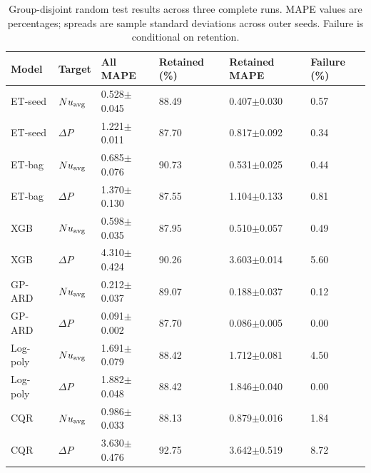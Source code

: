 \begin{table}[htbp]\centering\scriptsize\caption{Group-disjoint random test results across three complete runs. MAPE values are percentages; spreads are sample standard deviations across outer seeds. Failure is conditional on retention.}\label{tab:grouped}
\begin{tabular}{llllll}\toprule
Model & Target & All MAPE & Retained (\%) & Retained MAPE & Failure (\%)\\\midrule
ET-seed & $Nu_{\rm avg}$ & 0.528$\pm$0.045 & 88.49 & 0.407$\pm$0.030 & 0.57\\
ET-seed & $\Delta P$ & 1.221$\pm$0.011 & 87.70 & 0.817$\pm$0.092 & 0.34\\
ET-bag & $Nu_{\rm avg}$ & 0.685$\pm$0.076 & 90.73 & 0.531$\pm$0.025 & 0.44\\
ET-bag & $\Delta P$ & 1.370$\pm$0.130 & 87.55 & 1.104$\pm$0.133 & 0.81\\
XGB & $Nu_{\rm avg}$ & 0.598$\pm$0.035 & 87.95 & 0.510$\pm$0.057 & 0.49\\
XGB & $\Delta P$ & 4.310$\pm$0.424 & 90.26 & 3.603$\pm$0.014 & 5.60\\
GP-ARD & $Nu_{\rm avg}$ & 0.212$\pm$0.037 & 89.07 & 0.188$\pm$0.037 & 0.12\\
GP-ARD & $\Delta P$ & 0.091$\pm$0.002 & 87.70 & 0.086$\pm$0.005 & 0.00\\
Log-poly & $Nu_{\rm avg}$ & 1.691$\pm$0.079 & 88.42 & 1.712$\pm$0.081 & 4.50\\
Log-poly & $\Delta P$ & 1.882$\pm$0.048 & 88.42 & 1.846$\pm$0.040 & 0.00\\
CQR & $Nu_{\rm avg}$ & 0.986$\pm$0.033 & 88.13 & 0.879$\pm$0.016 & 1.84\\
CQR & $\Delta P$ & 3.630$\pm$0.476 & 92.75 & 3.642$\pm$0.519 & 8.72\\
\bottomrule\end{tabular}\end{table}
